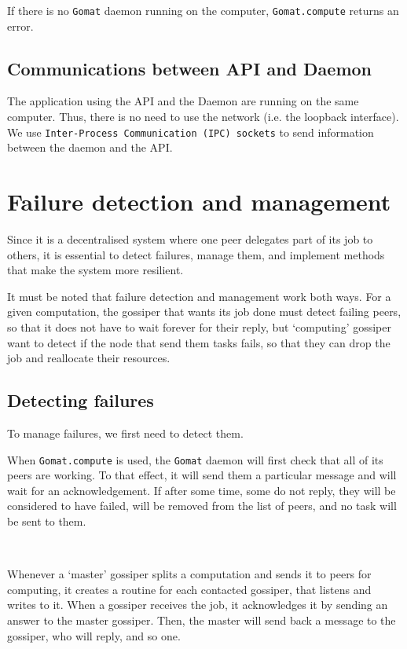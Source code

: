 \documentclass[a4paper,12pt]{article}
\newcommand{\Gomat}{\texttt{Gomat}\xspace}
\begin{document}
    If there is no \Gomat daemon running on the computer, \texttt{Gomat.compute} returns an error.

    \subsection{Communications between API and Daemon}
    The application using the API and the Daemon are running on the same computer. Thus, there is no need to use the network (i.e. the loopback interface).
    We use \texttt{Inter-Process Communication (IPC) sockets} to send information between the daemon and the API.

    \section{Failure detection and management}
    Since it is a decentralised system where one peer delegates part of its job to others, it is essential to detect failures, manage them, and implement methods that make the system more resilient.

    It must be noted that failure detection and management work both ways. For a given computation, the gossiper that wants its job done must detect failing peers, so that it does not have to wait forever for their reply, but ‘computing’ gossiper want to detect if the node that send them tasks fails, so that they can drop the job and reallocate their resources.

    \subsection{Detecting failures}
    To manage failures, we first need to detect them.

    When \texttt{Gomat.compute} is used, the \Gomat daemon will first check that all of its peers are working. To that effect, it will send them a particular message and will wait for an acknowledgement. If after some time, some do not reply, they will be considered to have failed, will be removed from the list of peers, and no task will be sent to them.

~~

    Whenever a ‘master’ gossiper splits a computation and sends it to peers for computing, it creates a routine for each contacted gossiper, that listens and writes to it.
When a gossiper receives the job, it acknowledges it by sending an answer to the master gossiper.
Then, the master will send back a message to the gossiper, who will reply, and so one.
\end{document}
